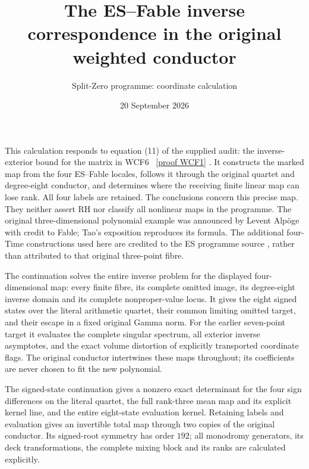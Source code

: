\documentclass[11pt]{article}
\title{The ES--Fable inverse correspondence in the original weighted conductor}
\author{Split-Zero programme: coordinate calculation}
\date{20 September 2026}
\begin{document}
\maketitle

This calculation responds to equation (11) of the supplied audit: the
inverse-exterior bound for the matrix in WCF6 \cite{WCF}%
~\href{https://github.com/KokunoYumeto/zeta-function-research-reader/blob/5992ad50c0f2a06921f1fcaded7b4e38097c0739/workbenches/splitzero-tandem/continuations/20260920-original-kernel-mixed-determinants/providers/WEIGHTED_CONDUCTOR_FORWARD.tex\#L28}{[proof WCF1]}%
{}. It constructs
the marked map from the four ES--Fable locales, follows it through the
original quartet and degree-eight conductor, and determines where the
receiving finite linear map can lose rank. All four labels are retained.
The conclusions concern this precise map. They neither assert RH nor
classify all nonlinear maps in the programme.
The original three-dimensional polynomial example was announced by
Levent Alp\"oge with credit to Fable; Tao's exposition \cite{Tao}
reproduces its formula. The additional four-Time constructions used here
are credited to the ES programme source \cite{ES}, rather than attributed
to that original three-point fibre.

The continuation solves the entire inverse problem for the displayed
four-dimensional map: every finite fibre, its complete omitted image,
its degree-eight inverse domain and its complete nonproper-value locus.
It gives the eight signed states over the literal arithmetic quartet,
their common limiting omitted target, and their escape in a fixed
original Gamma norm. For the earlier seven-point target it evaluates
the complete singular spectrum, all exterior inverse asymptotes, and
the exact volume distortion of explicitly transported coordinate flags.
The original conductor intertwines these maps throughout; its coefficients
are never chosen to fit the new polynomial.

The signed-state continuation gives a nonzero exact determinant for the
four sign differences on the literal quartet, the full rank-three mean
map and its explicit kernel line, and the entire eight-state evaluation
kernel. Retaining labels and evaluation gives an invertible total map
through two copies of the original conductor. Its signed-root symmetry
has order $192$; all monodromy generators, its deck transformations,
the complete mixing block and its ranks are calculated explicitly.
\end{document}
